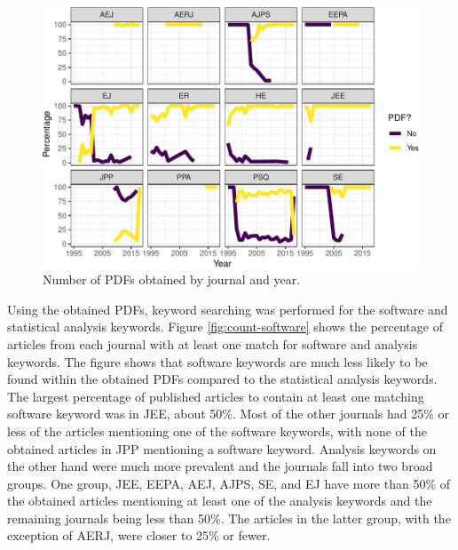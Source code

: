 \documentclass[
  english,
  ,man]{apa7}
\begin{document}
\begin{figure}
\centering
\includegraphics{software_files/figure-latex/pdf-time-1.pdf}
\caption{\label{fig:pdf-time}Number of PDFs obtained by journal and year.}
\end{figure}

Using the obtained PDFs, keyword searching was performed for the software and statistical analysis keywords. Figure \ref{fig:count-software} shows the percentage of articles from each journal with at least one match for software and analysis keywords. The figure shows that software keywords are much less likely to be found within the obtained PDFs compared to the statistical analysis keywords. The largest percentage of published articles to contain at least one matching software keyword was in JEE, about 50\%. Most of the other journals had 25\% or less of the articles mentioning one of the software keywords, with none of the obtained articles in JPP mentioning a software keyword. Analysis keywords on the other hand were much more prevalent and the journals fall into two broad groups. One group, JEE, EEPA, AEJ, AJPS, SE, and EJ have more than 50\% of the obtained articles mentioning at least one of the analysis keywords and the remaining journals being less than 50\%. The articles in the latter group, with the exception of AERJ, were closer to 25\% or fewer.
\end{document}
